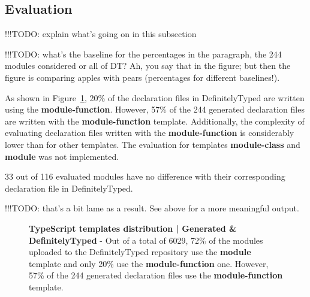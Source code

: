 \documentclass[a4paper,english,cleveref, autoref]{lipics-v2019}
\newcommand{\figref}[1]{Figure~\ref{#1}}
\begin{document}
\subsection{Evaluation}

!!!TODO: explain what's going on in this subsection

!!!TODO: what's the baseline for the percentages in the paragraph, the
244 modules considered or all of DT? Ah, you say that in the figure;
but then the figure is comparing apples with pears (percentages for
different baselines!).

As shown in
\figref{fig:experiments-typescript-templates-distribution-definitely-typed},
20\% of the declaration files in DefinitelyTyped are written using the
\textbf{module-function}. However, 57\% of the 244 generated
declaration files are written with the \textbf{module-function}
template. Additionally, the complexity of evaluating declaration files
written with the \textbf{module-function} is considerably lower than
for other templates. The evaluation for templates
\textbf{module-class} and \textbf{module} was not implemented. 

33 out of 116 evaluated modules have no difference with their
corresponding declaration file in DefinitelyTyped.

!!!TODO: that's a bit lame as a result. See above for a more
meaningful output.

\begin{figure}[tp]
	\centering

	\caption[TypeScript templates distribution | Generated \& DefinitelyTyped]{\textbf{TypeScript templates distribution | Generated \& DefinitelyTyped} - Out of a total of 6029, 72\% of the modules uploaded to the DefinitelyTyped repository use the \textbf{module} template and only 20\% use the \textbf{module-function} one. However, 57\% of the 244 generated declaration files use the \textbf{module-function} template.
	}

	\label{fig:experiments-typescript-templates-distribution-definitely-typed}
\end{figure}
\end{document}
